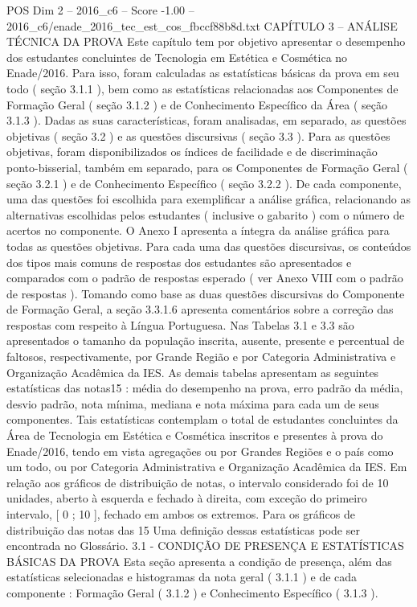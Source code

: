 \begin{textsample}{POS Dim 2 – 2016\_c6 – Score -1.00 – 2016\_c6/enade\_2016\_tec\_est\_cos\_fbccf88b8d.txt}  \label{ex:f2_pos_212}
CAPÍTULO 3 – ANÁLISE TÉCNICA DA PROVA Este capítulo tem por objetivo apresentar o desempenho dos estudantes concluintes de Tecnologia em Estética e Cosmética no Enade/2016.
Para isso, foram calculadas as estatísticas básicas da prova em seu todo ( seção 3.1.1 ), bem como as estatísticas relacionadas aos Componentes de Formação Geral ( seção 3.1.2 ) e de Conhecimento Específico da Área ( seção 3.1.3 ).
Dadas as suas características, foram analisadas, em separado, as questões objetivas ( seção 3.2 ) e as questões discursivas ( seção 3.3 ).
Para as questões objetivas, foram disponibilizados os índices de facilidade e de discriminação ponto-bisserial, também em separado, para os Componentes de Formação Geral ( seção 3.2.1 ) e de Conhecimento Específico ( seção 3.2.2 ).
De cada componente, uma das questões foi escolhida para exemplificar a análise gráfica, relacionando as alternativas escolhidas pelos estudantes ( inclusive o gabarito ) com o número de acertos no componente.
O Anexo I apresenta a íntegra da análise gráfica para todas as questões objetivas.
Para cada uma das questões discursivas, os conteúdos dos tipos mais comuns de respostas dos estudantes são apresentados e comparados com o padrão de respostas esperado ( ver Anexo VIII com o padrão de respostas ).
Tomando como base as duas questões discursivas do Componente de Formação Geral, a seção 3.3.1.6 apresenta comentários sobre a correção das respostas com respeito à Língua Portuguesa.
Nas Tabelas 3.1 e 3.3 são apresentados o tamanho da população inscrita, ausente, presente e percentual de faltosos, respectivamente, por Grande Região e por Categoria Administrativa e Organização Acadêmica da IES.
As demais tabelas apresentam as seguintes estatísticas das notas15 : média do desempenho na prova, erro padrão da média, desvio padrão, nota mínima, mediana e nota máxima para cada um de seus componentes.
Tais estatísticas contemplam o total de estudantes concluintes da Área de Tecnologia em Estética e Cosmética inscritos e presentes à prova do Enade/2016, tendo em vista agregações ou por Grandes Regiões e o país como um todo, ou por Categoria Administrativa e Organização Acadêmica da IES.
Em relação aos gráficos de distribuição de notas, o intervalo considerado foi de 10 unidades, aberto à esquerda e fechado à direita, com exceção do primeiro intervalo, [ 0 ; 10 ], fechado em ambos os extremos.
Para os gráficos de distribuição das notas das 15 Uma definição dessas estatísticas pode ser encontrada no Glossário. 3.1 - CONDIÇÃO DE PRESENÇA E ESTATÍSTICAS BÁSICAS DA PROVA Esta seção apresenta a condição de presença, além das estatísticas selecionadas e histogramas da nota geral ( 3.1.1 ) e de cada componente : Formação Geral ( 3.1.2 ) e Conhecimento Específico ( 3.1.3 ).

\end{textsample}
